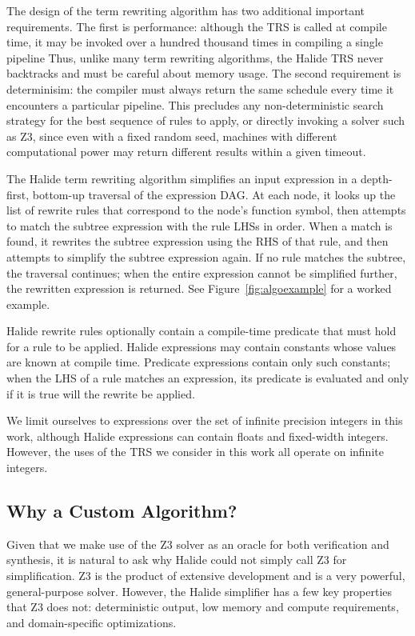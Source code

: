 \documentclass[sigplan,10pt,review,anonymous]{acmart}\settopmatter{printfolios=true,printccs=false,printacmref=false}
\begin{document}
The design of the term rewriting algorithm has two additional important
requirements. The first is performance: although the TRS is called at
compile time, it may be invoked over a hundred thousand times in compiling a single pipeline
Thus, unlike many term rewriting algorithms, the Halide TRS
never backtracks and must be careful about memory usage. The second requirement is determinisim: the compiler must
always return the same schedule every time it encounters a particular pipeline.
This precludes any non-deterministic search strategy for the best sequence of
rules to apply, or directly invoking a solver such as Z3, since even with a
fixed random seed, machines with different computational power may return
different results within a given timeout.

The Halide term rewriting algorithm simplifies an input expression in a
depth-first, bottom-up traversal of the expression DAG. At each node, it looks
up the list of rewrite rules that correspond to the node's function symbol, then
attempts to match the subtree expression with the rule LHSs in order. When a
match is found, it rewrites the subtree expression using the RHS of that rule,
and then attempts to simplify the subtree expression again. If no rule matches
the subtree, the traversal continues; when the entire expression cannot be
simplified further, the rewritten expression is returned. See Figure~\ref{fig:algoexample} for a worked example. 

Halide rewrite rules optionally contain a compile-time predicate that must hold for a rule to
be applied. Halide expressions may contain constants whose values are known at
compile time. Predicate expressions contain only such constants; when the
LHS of a rule matches an expression, its predicate is evaluated and only if it
is true will the rewrite be applied.

We limit ourselves to expressions over the set of infinite precision integers in
this work, although Halide expressions can contain floats and fixed-width
integers. However, the uses of the TRS we consider in this work all operate
on infinite integers.

\subsection{Why a Custom Algorithm?}

Given that we make use of the Z3 solver as an oracle for both verification and synthesis, it is natural to ask why Halide could not simply call Z3 for simplification. Z3 is the product of extensive development and is a very powerful, general-purpose solver. However, the Halide simplifier has a few key properties that Z3 does not: deterministic output, low memory and compute requirements, and domain-specific optimizations.
\end{document}
